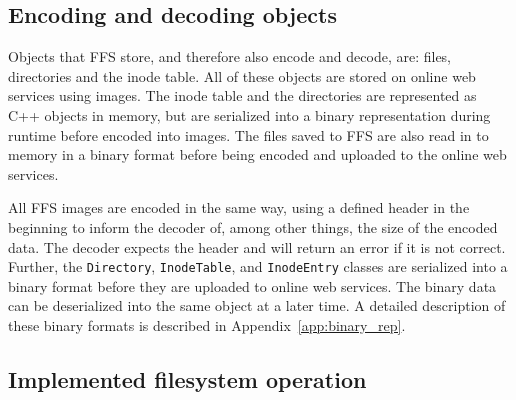 \subsection{Encoding and decoding objects}
\label{subsec:file_enc_dec}
Objects that FFS store, and therefore also encode and decode, are: files, directories and the inode table. All of these objects are stored on online web services using images. The inode table and the directories are represented as C++ objects in memory, but are serialized into a binary representation during runtime before encoded into images. The files saved to FFS are also read in to memory in a binary format before being encoded and uploaded to the online web services.

All FFS images are encoded in the same way, using a defined header in the beginning to inform the decoder of, among other things, the size of the encoded data. The decoder expects the header and will return an error if it is not correct. Further, the \texttt{Directory}, \texttt{InodeTable}, and \texttt{InodeEntry} classes are serialized into a binary format before they are uploaded to online web services. The binary data can be deserialized into the same object at a later time. A detailed description of these binary formats is described in Appendix~\ref{app:binary_rep}.


\subsection{Implemented filesystem operation}
\label{subsec:file_op}

